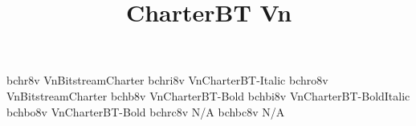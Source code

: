 \documentclass[test]{vnsample}
\title{CharterBT Vn}
\begin{document}
\begin{shortsample}
  {bchr8v}   {VnBitstreamCharter}
 {bchri8v}  {VnCharterBT-Italic}
 {bchro8v}  {VnBitstreamCharter}
  {bchb8v}   {VnCharterBT-Bold}
 {bchbi8v}  {VnCharterBT-BoldItalic}
 {bchbo8v}  {VnCharterBT-Bold}
 {bchrc8v}  {N/A}
 {bchbc8v}  {N/A}
\end{shortsample}
\end{document}
